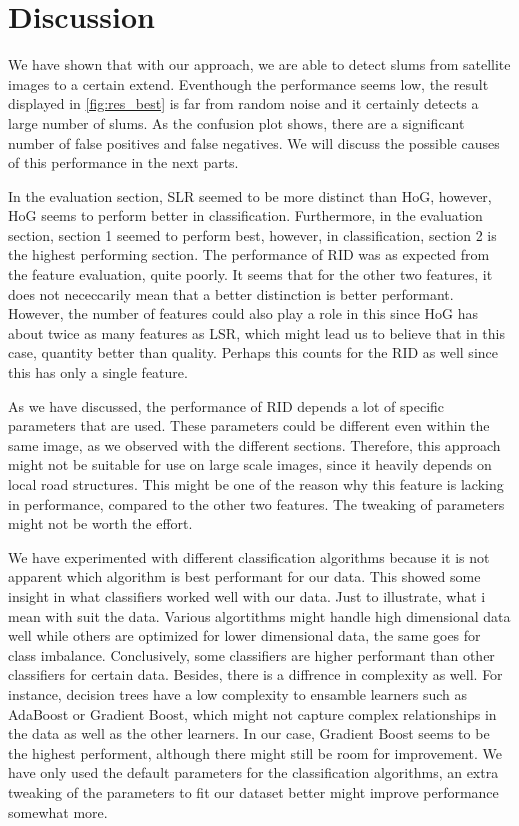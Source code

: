 \section{Discussion}
We have shown that with our approach, we are able to detect slums from satellite images to a certain extend. Eventhough the performance seems low, the result displayed in \ref{fig:res_best} is far from random noise and it certainly detects a large number of slums. As the confusion plot shows, there are a significant number of false positives and false negatives. We will discuss the possible causes of this performance in the next parts.

In the evaluation section, SLR seemed to be more distinct than HoG, however, HoG seems to perform better in classification. Furthermore, in the evaluation section, section 1 seemed to perform best, however, in classification, section 2 is the highest performing section. The performance of RID was as expected from the feature evaluation, quite poorly. It seems that for the other two features, it does not nececcarily mean that a better distinction is better performant. However, the number of features could also play a role in this since HoG has about twice as many features as LSR, which might lead us to believe that in this case, quantity better than quality. Perhaps this counts for the RID as well since this has only a single feature. 

As we have discussed, the performance of RID depends a lot of specific parameters that are used. These parameters could be different even within the same image, as we observed with the different sections. Therefore, this approach might not be suitable for use on large scale images, since it heavily depends on local road structures. This might be one of the reason why this feature is lacking in performance, compared to the other two features. The tweaking of parameters might not be worth the effort.

We have experimented with different classification algorithms because it is not apparent which algorithm is best performant for our data. This showed some insight in what classifiers worked well with our data. Just to illustrate, what i mean with suit the data. Various algortithms might handle high dimensional data well while others are optimized for lower dimensional data, the same goes for class imbalance. Conclusively, some classifiers are higher performant than other classifiers for certain data. Besides, there is a diffrence in complexity as well. For instance, decision trees have a low complexity to ensamble learners such as AdaBoost or Gradient Boost, which might not capture complex relationships in the data as well as the other learners. In our case, Gradient Boost seems to be the highest performent, although there might still be room for improvement. We have only used the default parameters for the classification algorithms, an extra tweaking of the parameters to fit our dataset better might improve performance somewhat more.




